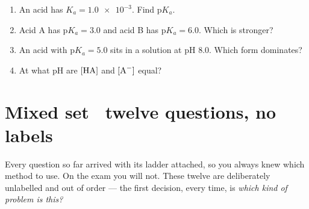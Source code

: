 \documentclass{apchem-worksheet}
\begin{document}
\begin{yourturn}
\begin{enumerate}[leftmargin=*,itemsep=0.5em]
  \item An acid has $K_{a} = \num{1.0e-3}$. Find p$K_{a}$.
        \workspace[1.6cm]
  \item Acid A has p$K_{a} = 3.0$ and acid B has p$K_{a} = 6.0$. Which
        is stronger? \workspace[1.6cm]
  \item An acid with p$K_{a} = 5.0$ sits in a solution at pH 8.0. Which
        form dominates? \workspace[1.8cm]
  \item At what pH are $[\ce{HA}]$ and $[\ce{A-}]$ equal?
        \workspace[1.6cm]
\end{enumerate}
\end{yourturn}

\section*{\sffamily Mixed set \textbullet\ twelve questions, no labels}

\begin{apcnote}
Every question so far arrived with its ladder attached, so you always
knew which method to use. On the exam you will not. These twelve are
deliberately unlabelled and out of order --- the first decision, every
time, is \emph{which kind of problem is this?}
\end{apcnote}
\end{document}
